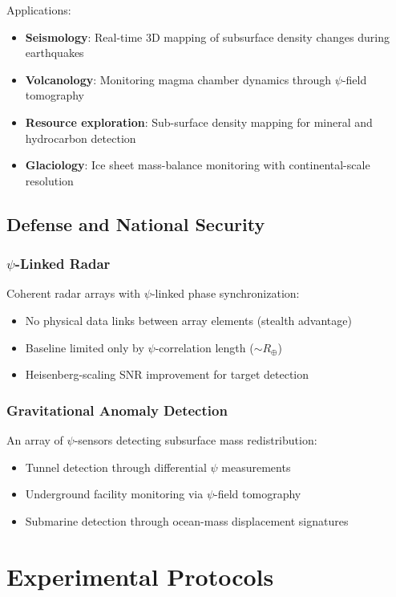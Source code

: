 \documentclass[12pt,a4paper]{article}
\theoremstyle{remark}
\begin{document}
Applications:
\begin{itemize}
\item \textbf{Seismology}: Real-time 3D mapping of subsurface density
changes during earthquakes
\item \textbf{Volcanology}: Monitoring magma chamber dynamics through
$\psi$-field tomography
\item \textbf{Resource exploration}: Sub-surface density mapping for
mineral and hydrocarbon detection
\item \textbf{Glaciology}: Ice sheet mass-balance monitoring with
continental-scale resolution
\end{itemize}

\subsection{Defense and National Security}\label{sec:defense}

\subsubsection{$\psi$-Linked Radar}
Coherent radar arrays with $\psi$-linked phase synchronization:
\begin{itemize}
\item No physical data links between array elements (stealth advantage)
\item Baseline limited only by $\psi$-correlation length ($\sim R_\oplus$)
\item Heisenberg-scaling SNR improvement for target detection
\end{itemize}

\subsubsection{Gravitational Anomaly Detection}
An array of $\psi$-sensors detecting subsurface mass redistribution:
\begin{itemize}
\item Tunnel detection through differential $\psi$ measurements
\item Underground facility monitoring via $\psi$-field tomography
\item Submarine detection through ocean-mass displacement signatures
\end{itemize}


\section{Experimental Protocols}\label{sec:protocols}
\end{document}
